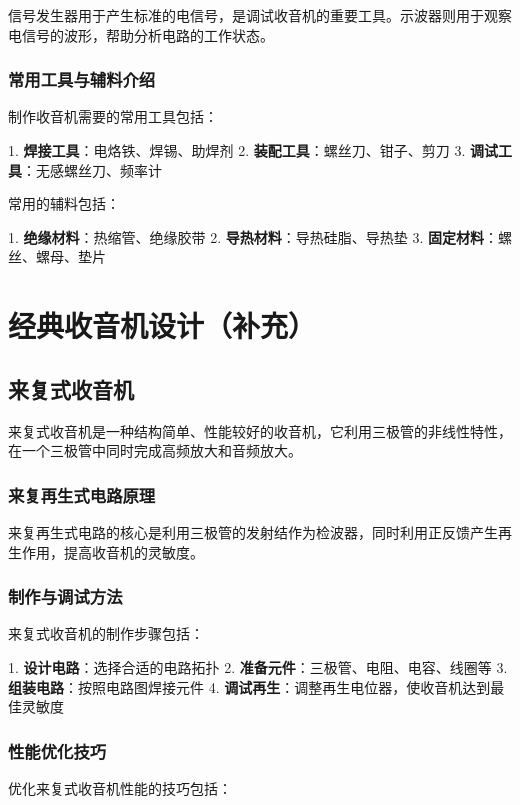 \documentclass[12pt,UTF8]{ctexbook}
\begin{document}
信号发生器用于产生标准的电信号，是调试收音机的重要工具。示波器则用于观察电信号的波形，帮助分析电路的工作状态。

\section{常用工具与辅料介绍}

制作收音机需要的常用工具包括：

1. \textbf{焊接工具}：电烙铁、焊锡、助焊剂
2. \textbf{装配工具}：螺丝刀、钳子、剪刀
3. \textbf{调试工具}：无感螺丝刀、频率计

常用的辅料包括：

1. \textbf{绝缘材料}：热缩管、绝缘胶带
2. \textbf{导热材料}：导热硅脂、导热垫
3. \textbf{固定材料}：螺丝、螺母、垫片

\part{经典收音机设计（补充）}

\chapter{来复式收音机}

来复式收音机是一种结构简单、性能较好的收音机，它利用三极管的非线性特性，在一个三极管中同时完成高频放大和音频放大。

\section{来复再生式电路原理}

来复再生式电路的核心是利用三极管的发射结作为检波器，同时利用正反馈产生再生作用，提高收音机的灵敏度。

\section{制作与调试方法}

来复式收音机的制作步骤包括：

1. \textbf{设计电路}：选择合适的电路拓扑
2. \textbf{准备元件}：三极管、电阻、电容、线圈等
3. \textbf{组装电路}：按照电路图焊接元件
4. \textbf{调试再生}：调整再生电位器，使收音机达到最佳灵敏度

\section{性能优化技巧}

优化来复式收音机性能的技巧包括：
\end{document}
